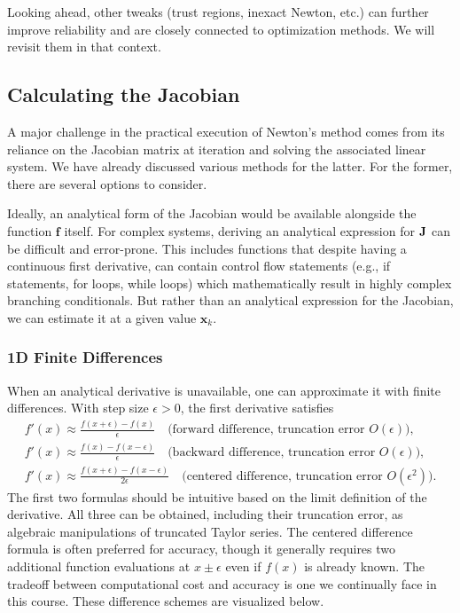 Looking ahead, other tweaks (trust regions, inexact Newton, etc.) can further improve reliability and are closely connected to optimization methods. We will revisit them in that context.



\subsection{Calculating the Jacobian} 
A major challenge in the practical execution of Newton's method comes from its reliance on the Jacobian matrix at iteration and solving the associated linear system. We have already discussed various methods for the latter. For the former, there are several options to consider. 

Ideally, an analytical form of the Jacobian would be available alongside the function $\mathbf f$ itself. For complex systems, deriving an analytical expression for \(\mathbf{J}\) can be difficult and error-prone. This includes functions that despite having a continuous first derivative, can contain control flow statements (e.g., if statements, for loops, while loops) which mathematically result in highly complex branching conditionals. But rather than an analytical expression for the Jacobian, we can estimate it at a given value $\mathbf x_k$.  %

\subsubsection{1D Finite Differences} 
When an analytical derivative is unavailable, one can approximate it with finite differences. With step size \(\epsilon>0\), the first derivative satisfies
\begin{gather*}
  f'(x) \approx \frac{f(x+\epsilon)-f(x)}{\epsilon}
  \quad\text{(forward difference, truncation error }O(\epsilon)\text{),} \\
  f'(x) \approx \frac{f(x)-f(x-\epsilon)}{\epsilon}
  \quad\text{(backward difference, truncation error }O(\epsilon)\text{),} \\
  f'(x) \approx \frac{f(x+\epsilon)-f(x-\epsilon)}{2\epsilon}
  \quad\text{(centered difference, truncation error }O(\epsilon^2)\text{).}
\end{gather*}
The first two formulas should be intuitive based on the limit definition of the derivative. All three can be obtained, including their truncation error, as algebraic manipulations of truncated Taylor series. The centered difference formula is often preferred for accuracy, though it generally requires two additional function evaluations at \(x\pm\epsilon\) even if \(f(x)\) is already known. The tradeoff between computational cost and accuracy is one we continually face in this course. These difference schemes are visualized below. 

